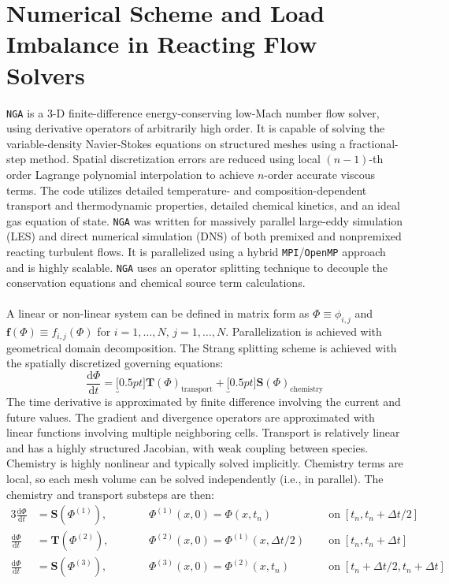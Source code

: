\documentclass{homework}
\begin{document}


\newpage
\appendix
\section{\textbf{Numerical Scheme and Load Imbalance in Reacting Flow Solvers}} \label{appendixA}
\noindent \texttt{NGA} \cite{DESJARDINS2008,MACART2016} is a 3-D finite-difference energy-conserving low-Mach number flow solver, using derivative operators of arbitrarily high order. It is capable of solving the variable-density Navier-Stokes equations on structured meshes using a fractional-step method. Spatial discretization errors are reduced using local $(n-1)$-th order Lagrange polynomial interpolation to achieve $n$-order accurate viscous terms. The code utilizes detailed temperature- and composition-dependent transport and thermodynamic properties, detailed chemical kinetics, and an ideal gas equation of state. \texttt{NGA} was written for massively parallel large-eddy simulation (LES) and direct numerical simulation (DNS) of both premixed and nonpremixed reacting turbulent flows. It is parallelized using a hybrid \texttt{MPI}/\texttt{OpenMP} approach and is highly scalable. \texttt{NGA} uses an operator splitting technique to decouple the conservation equations and chemical source term calculations. 
\\ \\ \noindent
A linear or non-linear system can be defined in matrix form as $\Phi \equiv \phi_{i,j} $ and $\mathbf{f}(\Phi) \equiv f_{i,j} (\Phi)$ for $ i= 1, \dots, N $, $ j= 1, \dots, N $. Parallelization is achieved with geometrical domain decomposition. The Strang splitting scheme is achieved with the spatially discretized governing equations:
$$\frac{\textrm{d} \Phi}{\textrm{d} t} = \underbracket[0.5pt]{\mathbf{T}(\Phi)}_{\textrm{transport}} + \underbracket[0.5pt]{\mathbf{S}(\Phi)}_{\textrm{chemistry}} $$
The time derivative is approximated by finite difference involving
the current and future values. The gradient and divergence operators are approximated with linear functions involving multiple neighboring cells. Transport is relatively linear and has a highly structured Jacobian, with weak coupling between species. Chemistry is highly nonlinear and typically solved implicitly. Chemistry terms are local, so each mesh volume can be solved independently (i.e., in parallel). The chemistry and transport substeps are then:
\scriptsize
\begin{alignat*}{3}
    \frac{\textrm{d} \Phi}{\textrm{d} t} &= \mathbf{S}(\Phi^{(1)}), \qquad &&\Phi^{(1)}(x,0) = \Phi(x,t_n) \;\; & &\textrm{on} \; [t_n, t_n + \Delta t / 2] \\
    \frac{\textrm{d} \Phi}{\textrm{d} t} &= \mathbf{T}(\Phi^{(2)}), \qquad &&\Phi^{(2)}(x,0) = \Phi^{(1)}(x,\Delta t / 2) \;\; & &\textrm{on} \; [t_n, t_n + \Delta t] \\
    \frac{\textrm{d} \Phi}{\textrm{d} t} &= \mathbf{S}(\Phi^{(3)}), \qquad &&\Phi^{(3)}(x,0) = \Phi^{(2)}(x,t_n) \;\; & &\textrm{on} \; [t_n + \Delta t / 2, t_n + \Delta t]
\end{alignat*}
\end{document}

